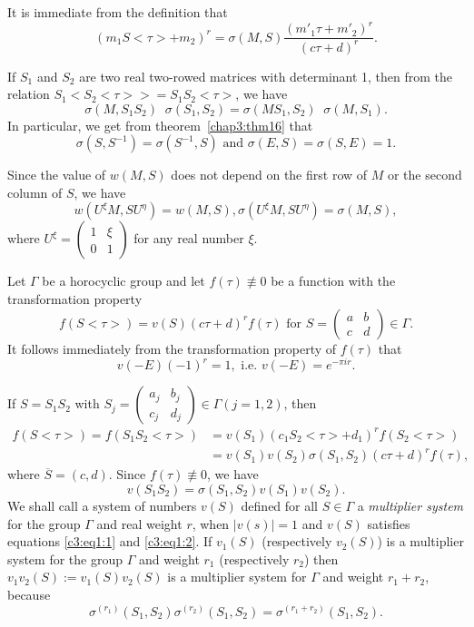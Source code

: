 It is immediate from the definition that 
$$
(m_1 S<\tau>+m_2)^r = \sigma(M,S) \frac{(m'_1\tau+m'_2)^r}{(c\tau+d)^r}.
$$

If $S_1$ and $S_2$ are two real two-rowed matrices with determinant
1, then from the relation $S_1<S_2<\tau>>=S_1S_2<\tau>$, we have 
$$
\sigma(M,S_1S_2) \;\; \sigma(S_1, S_2) = \sigma(MS_1, S_2) \;\;
\sigma(M,S_1). 
$$ 
In particular, we get from theorem~\ref{chap3:thm16} that 
$$
\sigma (S,S^{-1}) = \sigma(S^{-1},S) \text{ and } \sigma(E,S) = \sigma
(S,E) =1.
$$

Since the value of $w(M,S)$ does not depend on the first row of $M$ or
the second column of $S$, we have 
$$
w(U^{\xi} M, S U^{\eta}) = w (M, S), \sigma(U^{\xi} M, S U^{\eta}) = \sigma(M,S),
$$
where $U^{\xi} = \left(\begin{smallmatrix}
  1&\xi\\0&1 \end{smallmatrix} \right)$ for any real number $\xi$.

Let $\Gamma$ be a horocyclic group and let $f(\tau)\not\equiv 0$ be a
function with the transformation property
$$
f(S<\tau>) = v (S) (c\tau+d)^r f (\tau) \text{ for } S =
\left(\begin{smallmatrix} a&b\\c &d \end{smallmatrix} \right)
\in \Gamma. 
$$
It follows immediately from the transformation property of $f(\tau)$
that 
\begin{equation*}
v(-E)(-1)^r = 1, \text{ i.e. } 
v(-E) = e^{-\pi i r}. \tag{1}\label{c3:eq1:1}
\end{equation*}

If \pageoriginale $S=S_1S_2$ with $S_j = \left(\begin{smallmatrix} a_j
  & b_j\\c_j & d_j \end{smallmatrix} \right)\in \Gamma
(j=1,2)$, then  
\begin{align*}
f(S<\tau>) = f(S_1S_2<\tau>) & = v(S_1) (c_1 S_2 <\tau>+d_1)^r
f(S_2<\tau>)\\
& = v(S_1)v(S_2) \sigma (S_1, S_2) (c\tau +d)^r f(\tau),
\end{align*}
where $\overline{S}=(c,d)$. Since $f(\tau)\not\equiv 0$, we have
\begin{equation*}
v(S_1S_2) = \sigma(S_1, S_2) 
v(S_1)v(S_2). \tag{2}\label{c3:eq1:2}
\end{equation*}
We shall call a system of numbers $v(S)$ defined for all $S\in
\Gamma$ a \textit{multiplier system} for the group $\Gamma$ and real
weight $r$, when $|v(s)|=1$ and $v(S)$ satisfies equations 
\eqref{c3:eq1:1} and \eqref{c3:eq1:2}. If $v_1(S)$ 
(respectively $v_2(S)$) is a multiplier system for
the group $\Gamma$ and weight $r_1$ (respectively $r_2$) then
$v_1v_2(S):=v_1(S)v_2(S)$ is a multiplier system for $\Gamma$ and
weight $r_1+r_2$, because
$$
\sigma^{(r_1)} (S_1, S_2) \sigma^{(r_2)}(S_1, S_2) =
\sigma^{(r_1+r_2)} (S_1, S_2). 
$$

